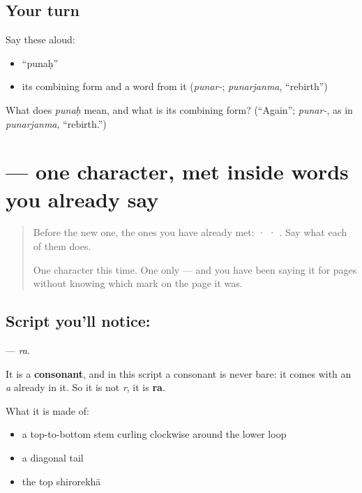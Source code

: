 \subsection*{Your turn}
Say these aloud:

\begin{itemize}
\raggedright
  \item \textquotedblleft{}punaḥ\textquotedblright{}
  \item its combining form and a word from it (\emph{punar-}; \emph{punarjanma}, \textquotedblleft{}rebirth\textquotedblright{})
\end{itemize}

\begin{tcolorbox}[breakable,colback=teal!4,colframe=teal!35!black,title={Before you move on}]
What does \emph{punaḥ} mean, and what is its combining form? (\textquotedblleft{}Again\textquotedblright{}; \emph{punar-}, as in \emph{punarjanma}, \textquotedblleft{}rebirth.\textquotedblright{})
\end{tcolorbox}
\section[\texorpdfstring{\sk{र} (ra)}{र (ra)}]{ — one character, met inside words you already say}

\label{lesson:SA-S110-letter-ra}



\begin{quote}
Before the new one, the ones you have already met:  ·  · . Say what each of them does.

One character this time. One only — and you have been saying it for pages without knowing which mark on the page it was.
\end{quote}

\subsection*{Script you'll notice: }
\textbf{} — \emph{ra}.

It is a \textbf{consonant}, and in this script a consonant is never bare: it comes with an \emph{a} already in it. So it is not \emph{r}, it is \textbf{ra}.

What it is made of:

\begin{itemize}
\raggedright
  \item a top-to-bottom stem curling clockwise around the lower loop
  \item a diagonal tail
  \item the top shirorekhā
\end{itemize}

